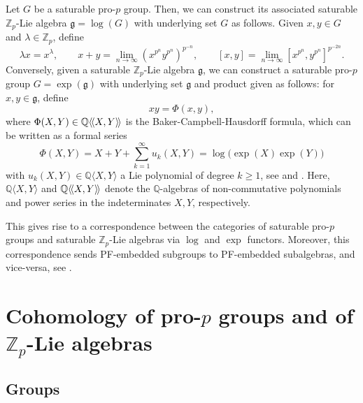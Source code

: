 \documentclass[11pt]{article}
\newcommand{\Z}{\mathbb{Z}}
\newcommand{\Q}{\mathbb{Q}}
\newcommand{\Zp}{\mathbb{Z}_p}
\newcommand{\g}{\mathfrak{g}}
\DeclarePairedDelimiter{\dangle}{\langle\mkern-2.75mu\langle}{\rangle\mkern-2.75mu\rangle}
\theoremstyle{plain}
\theoremstyle{definition}
\begin{document}
	
	Let $G$ be a saturable pro-$p$ group. Then, we can construct its associated saturable $\Zp$-Lie algebra $\g=\log(G)$ with underlying set $G$ as follows. Given $x,y\in G$ and $\lambda\in \Zp$, define 
	\begin{displaymath}
		\lambda x=x^{\lambda}, \qquad x+y =\lim_{n\to \infty} (x^{p^n}y^{p^n})^{p^{-n}}, \qquad [x,y]=\lim_{n\to \infty}[x^{p^n},y^{p^n}]^{p^{-2n}}. 
	\end{displaymath}
	Conversely, given a saturable $\Zp$-Lie algebra $\g$, we can construct a saturable pro-$p$ group $G=\exp(\g)$ with underlying set $\g$ and product given as follows: for $x,y\in\g$, define 
	\begin{displaymath}
		xy=\Phi(x,y),
	\end{displaymath}
	where $\Phi(X,Y)\in\Q\dangle{X,Y}$ is the Baker-Campbell-Hausdorff formula, which can be written as a formal series
	\begin{displaymath}
		\Phi(X,Y)=X+Y + \sum_{k=1}^{\infty}u_k(X,Y) =\log\big(\exp (X)\exp (Y)\big)
	\end{displaymath}
	with $u_k(X,Y)\in \Q\langle X,Y\rangle$ a Lie polynomial of degree $k\geq 1$, see \cite[Section 6.5]{dixondusautoy99} and \cite[Section VII.32]{schneider13}. Here, $\Q\langle X,Y\rangle$ and $\Q\dangle{X,Y}$ denote the $\Q$-algebras of non-commutative polynomials and power series in the indeterminates $X,Y$, respectively.
	
	
	This gives rise to a correspondence between the categories of saturable pro-$p$ groups and saturable $\Zp$-Lie algebras via $\log$ and $\exp$ functors. Moreover, this correspondence sends PF-embedded subgroups to PF-embedded subalgebras, and vice-versa, see \cite{gonzalezklopsch09}.


\section{Cohomology of pro-$p$ groups and of $\Z_p$-Lie algebras}\label{sec: cohomology}


\subsection{Groups}
\end{document}
